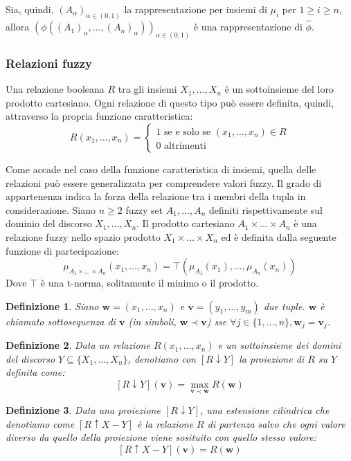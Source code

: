 \documentclass[10pt,a4paper]{article}
\newtheorem{definition}{Definizione}
\newcommand{\ww}{\mathbf{w}}
\newcommand{\vv}{\mathbf{v}}
\begin{document}
Sia, quindi, $(A_\alpha)_{\alpha \in (0,1)}$ la rappresentazione per insiemi di $\mu_i$ per $1 \geq i \geq n$, allora $(\phi((A_1)_\alpha, \dots, (A_n)_\alpha))_{\alpha \in (0,1)}$ è una rappresentazione di $\hat{\phi}$. 

\subsubsection{Relazioni fuzzy}

Una relazione booleana $R$ tra gli insiemi $X_1, \dots, X_n$ è un sottoinsieme del loro prodotto cartesiano. Ogni relazione di questo tipo può essere definita, quindi, attraverso la propria funzione caratteristica:
$$
R(x_1,\dots,x_n) = \begin{cases}
						1 \text{ se e solo se } (x_1, \dots, x_n) \in R \\
						0 \text{ altrimenti }
					\end{cases}
$$

Come accade nel caso della funzione caratteristica di insiemi, quella delle relazioni può essere generalizzata per comprendere valori fuzzy. Il grado di appartenenza indica la forza della relazione tra i membri della tupla in considerazione. Siano $n \geq 2$ fuzzy set $A_1, \dots, A_n$ definiti rispettivamente sul dominio del discorso $X_1, \dots, X_n$. Il prodotto cartesiano $A_1 \times \dots \times A_n$ è una relazione fuzzy nello spazio prodotto $X_1 \times \dots \times X_n$ ed è definita dalla seguente funzione di partecipazione:
$$
\mu_{A_1 \times \dots \times A_n}(x_1, \dots, x_n) = \top(\mu_{A_1}(x_1), \dots,\mu_{A_n}(x_n))
$$	 
Dove $\top$ è una t-norma, solitamente il minimo o il prodotto.

\begin{definition}
Siano $\ww = (x_1, \dots, x_n)$ e $\vv = (y_1, \dots, y_m)$ due tuple. $\ww$ è chiamato \emph{sottosequenza} di $\vv$ (in simboli, $\ww \prec \vv$) sse $\forall j \in \{1,\dots,n\}, \ww_j = \vv_j$.
\end{definition}

\begin{definition}
Data un relazione $R(x_1,\dots,x_n)$ e un sottoinsieme dei domini del discorso $Y \subseteq \{X_1, \dots, X_n\}$, denotiamo con $[R \downarrow Y]$ la \emph{proiezione} di $R$ su $Y$ definita come:
$$
[R \downarrow Y](\vv) = \max_{\vv \prec \ww} R(\ww)
$$
\end{definition}

\begin{definition}
Data una proiezione $[R \downarrow Y]$, una \emph{estensione cilindrica} che denotiamo come $[R \uparrow X-Y]$ è la relazione $R$ di partenza salvo che ogni valore diverso da quello della proiezione viene sosituito con quello stesso valore:
$$
[R \uparrow X-Y](\vv) = R(\ww)
$$
\end{definition}
\end{document}
